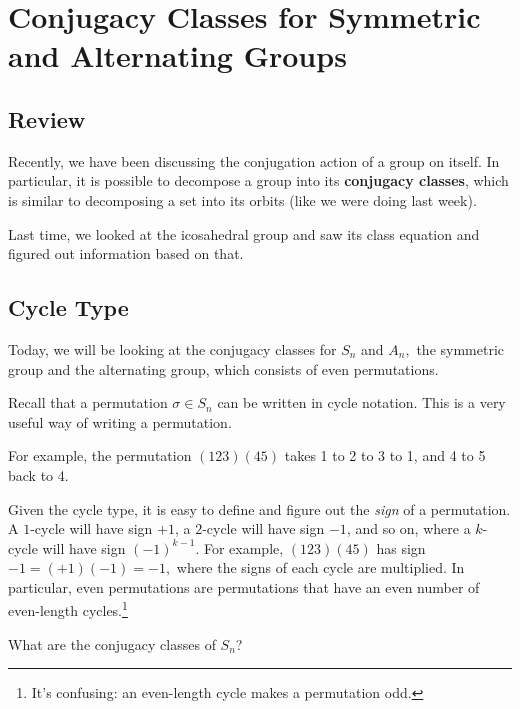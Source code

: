 
\section{Conjugacy Classes for Symmetric and Alternating Groups}

\subsection{Review}

Recently, we have been discussing the conjugation action of a group on itself. In particular, it is possible to decompose a group into its \textbf{conjugacy classes}, which is similar to decomposing a set into its orbits (like we were doing last week).

Last time, we looked at the icosahedral group and saw its class equation and figured out information based on that.

\subsection{Cycle Type}
Today, we will be looking at the conjugacy classes for $S_n$ and $A_n,$ the symmetric group and the alternating group, which consists of even permutations. 

Recall that a permutation $\sigma \in S_n$ can be written in cycle notation. This is a very useful way of writing a permutation.

\begin{example}
For example, the permutation $(123)(45)$ takes 1 to 2 to 3 to 1, and 4 to 5 back to 4. 
\end{example}

Given the cycle type, it is easy to define and figure out the \emph{sign} of a permutation. A $1$-cycle will have sign $+1$, a $2$-cycle will have sign $-1$, and so on, where a $k$-cycle will have sign $(-1)^{k-1}.$ For example, $(123)(45)$ has sign $-1 = (+1)(-1) = -1,$ where the signs of each cycle are multiplied. In particular, even permutations are permutations that have an even number of even-length cycles.\footnote{It's confusing: an even-length cycle makes a permutation odd.}

\begin{qq}
What are the conjugacy classes of $S_n$?
\end{qq}

